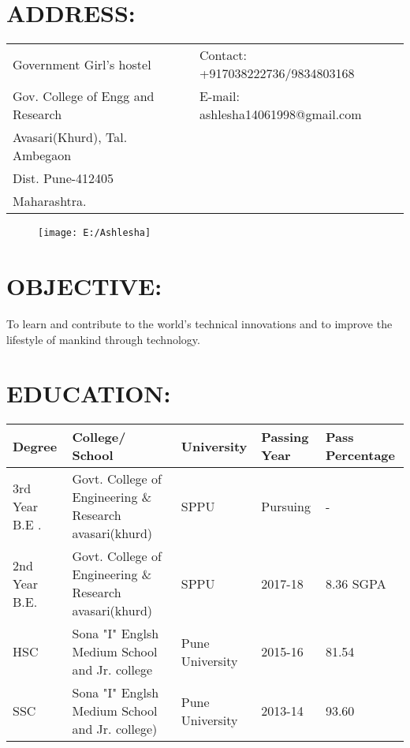 \documentclass[margin,line]{res}
\begin{document}
\hspace{5cm}

\begin{resume}
\section{\bf ADDRESS:}

\begin{tabular}{@{}p{3.5in}p{3in}}
Government Girl's hostel             & {Contact:} +917038222736/9834803168 \\
Gov. College of Engg and Research 
 & {E-mail:}  ashlesha14061998@gmail.com\\
Avasari(Khurd), Tal. Ambegaon\\
Dist. Pune-412405\\
Maharashtra.
\end{tabular}

\begin{figure}[h]
	\hspace{11cm}
	\texttt{[image: E:/Ashlesha]}
\end{figure}   

\section{\bf OBJECTIVE:}

To learn and contribute to the world's technical innovations and to improve the lifestyle of mankind through technology.

\section{\bf EDUCATION:}
\vspace{0.5cm}



\begin{tabular}{|p{1.5cm}|p{4.5cm}|p{3cm}|p{2.0cm}|p{1.7cm}|}
	\hline
	\textbf{Degree} & \textbf{College/ School} & \textbf{University} & \textbf{Passing Year} & \textbf{Pass Percentage}\\ [0.5ex] 
	\hline
	3rd Year B.E . &Govt. College of Engineering \& Research avasari(khurd)   &SPPU &Pursuing& - \\ 
	\hline
	2nd Year B.E. &Govt. College of Engineering \& Research avasari(khurd) &SPPU &2017-18& 8.36 SGPA \\ 
	\hline
	HSC & Sona "I" Englsh Medium School and Jr. college& Pune University  &2015-16 & 81.54 \\
	\hline
	SSC &Sona "I" Englsh Medium School and Jr. college) &Pune University&2013-14&93.60\\
        \hline
\end{tabular}


\end{resume}
\end{document}
